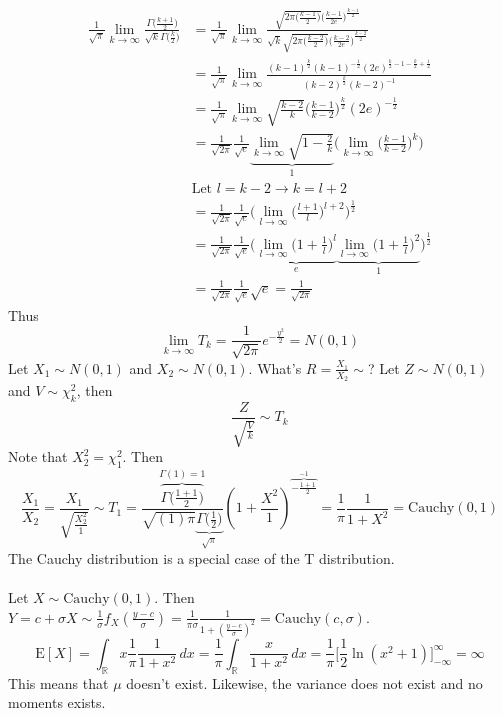 \documentclass[12pt]{article}
\newcommand{\expected}[1]{\mathrm{E}[#1]}
\begin{document}
$$ \begin{aligned} \frac{1}{\sqrt{\pi}} \lim_{k \to \infty} \frac{\Gamma\Big( \frac{k+1}{2}\Big)}{\sqrt{k}\Gamma\Big( \frac{k}{2}\Big)} &=  \frac{1}{\sqrt{\pi}} \lim_{k \to \infty} \frac{\sqrt{2\pi \Big( \frac{k-1}{2}\Big)} \Big( \frac{k-1}{2e}\Big)^{\frac{k-1}{2}}}{\sqrt{k} \sqrt{2\pi \Big( \frac{k-2}{2}\Big)} \Big( \frac{k-2}{2e}\Big)^{\frac{k-2}{2}}} \\ &= \frac{1}{\sqrt{\pi}} \lim_{k \to \infty} \frac{(k-1)^{\frac{k}{2}} (k-1)^{-\frac{1}{2}} (2e)^{\frac{k}{2} - 1 - \frac{k}{2} + \frac{1}{2}}}{(k-2)^{\frac{k}{2}}(k - 2)^{-1}} \\ &= \frac{1}{\sqrt{\pi}} \lim_{k \to \infty} \sqrt{\frac{k-2}{k}} \Big( \frac{k-1}{k-2}\Big)^{\frac{k}{2}} (2e)^{-\frac{1}{2}} \\ &= \frac{1}{\sqrt{2\pi}} \frac{1}{\sqrt{e}} \underbrace{\lim_{k \to \infty} \sqrt{1 - \frac{2}{k}}}_1 \Big( \lim_{k \to \infty} \Big( \frac{k-1}{k-2}\Big)^k \Big) \\ &\text{Let } l = k-2 \to k = l + 2 \\ &= \frac{1}{\sqrt{2\pi}} \frac{1}{\sqrt{e}} \Bigg( \lim_{l \to \infty} \Big( \frac{l+1}{l}\Big)^{l+2}\Bigg)^{\frac{1}{2}} \\ &= \frac{1}{\sqrt{2\pi}} \frac{1}{\sqrt{e}} \Bigg( \underbrace{\lim_{l \to \infty} \Big(1 + \frac{1}{l})^l}_e \underbrace{\lim_{l \to \infty} \Big(1 + \frac{1}{l}\Big)^2}_1\Bigg)^{\frac{1}{2}} \\ &= \frac{1}{\sqrt{2\pi}} \frac{1}{\sqrt{e}} \sqrt{e} = \frac{1}{\sqrt{2\pi}} \end{aligned} $$ 
Thus $$ \lim_{k \to \infty} T_k = \frac{1}{\sqrt{2\pi}} e^{-\frac{y^2}{2}} = N(0,1)$$ 
Let $X_1 \sim N(0,1)$ and $X_2 \sim N(0,1)$. What's $R = \frac{X_1}{X_2} \sim $? Let $Z \sim N(0,1)$ and $V \sim \chi_k^2$, then $$ \frac{Z}{\sqrt{\frac{V}{k}}} \sim T_k$$ Note that $X_2^2 = \chi_1^2$. Then $$ \frac{X_1}{X_2} = \frac{X_1}{\sqrt{\frac{X_2^2}{1}}} \sim T_1 = \frac{\overbrace{\Gamma\Big(\frac{1+1}{2}\Big)}^{\Gamma(1) = 1}}{\sqrt{(1)\pi}\underbrace{\Gamma\Big( \frac{1}{2}\Big)}_{\sqrt{\pi}}}(1 + \frac{X^2}{1})^{\overbrace{- \frac{1+1}{2}}^{-1}} = \frac{1}{\pi} \frac{1}{1+X^2} = \text{Cauchy}(0,1)$$ 
The Cauchy distribution is a special case of the T distribution. \\~\\
Let $X \sim \text{Cauchy}(0,1)$. Then $Y = c + \sigma X \sim \frac{1}{\sigma}f_X(\frac{y-c}{\sigma}) = \frac{1}{\pi \sigma} \frac{1}{1+ (\frac{y-c}{\sigma})^2} = \text{Cauchy}(c,\sigma)$. 
$$ \expected{X} = \int_{\mathbb{R}} x \frac{1}{\pi} \frac{1}{1+x^2} \, dx = \frac{1}{\pi} \int_{\mathbb{R}} \frac{x}{1+x^2} \, dx = \frac{1}{\pi}\Big[ \frac{1}{2} \ln(x^2 + 1)\Big]_{-\infty}^{\infty} = \infty $$ This means that $\mu$ doesn't exist. Likewise, the variance does not exist and no moments exists. 
\end{document}

